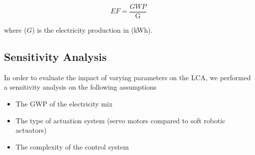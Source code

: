 \begin{description}
\begin{equation}
EF=\frac{GWP}{\mathrm{G}}
\label{eq:EF}
\end{equation}

where ($G$) is the electricity production in (kWh).



\end{description}

\subsection{Sensitivity Analysis}

In order to evaluate the impact of varying parameters on the LCA, we performed a sensitivity analysis on the following assumptions
\begin{itemize}
\item The GWP of the electricity mix
\item The type of actuation system (servo motors compared to soft robotic actuators)
\item The complexity of the control system
\end{itemize}


